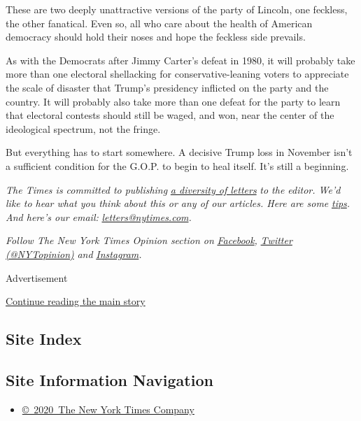 These are two deeply unattractive versions of the party of Lincoln, one
feckless, the other fanatical. Even so, all who care about the health of
American democracy should hold their noses and hope the feckless side
prevails.

As with the Democrats after Jimmy Carter's defeat in 1980, it will
probably take more than one electoral shellacking for
conservative-leaning voters to appreciate the scale of disaster that
Trump's presidency inflicted on the party and the country. It will
probably also take more than one defeat for the party to learn that
electoral contests should still be waged, and won, near the center of
the ideological spectrum, not the fringe.

But everything has to start somewhere. A decisive Trump loss in November
isn't a sufficient condition for the G.O.P. to begin to heal itself.
It's still a beginning.

\emph{The Times is committed to publishing}
\href{https://www.nytimes.com/2019/01/31/opinion/letters/letters-to-editor-new-york-times-women.html}{\emph{a
diversity of letters}} \emph{to the editor. We'd like to hear what you
think about this or any of our articles. Here are some}
\href{https://help.nytimes.com/hc/en-us/articles/115014925288-How-to-submit-a-letter-to-the-editor}{\emph{tips}}\emph{.
And here's our email:}
\href{mailto:letters@nytimes.com}{\emph{letters@nytimes.com}}\emph{.}

\emph{Follow The New York Times Opinion section on}
\href{https://www.facebook.com/nytopinion}{\emph{Facebook}}\emph{,}
\href{http://twitter.com/NYTOpinion}{\emph{Twitter (@NYTopinion)}}
\emph{and}
\href{https://www.instagram.com/nytopinion/}{\emph{Instagram}}\emph{.}

Advertisement

\protect\hyperlink{after-bottom}{Continue reading the main story}

\hypertarget{site-index}{%
\subsection{Site Index}\label{site-index}}

\hypertarget{site-information-navigation}{%
\subsection{Site Information
Navigation}\label{site-information-navigation}}

\begin{itemize}
\tightlist
\item
  \href{https://help.nytimes.com/hc/en-us/articles/115014792127-Copyright-notice}{©~2020~The
  New York Times Company}
\end{itemize}

